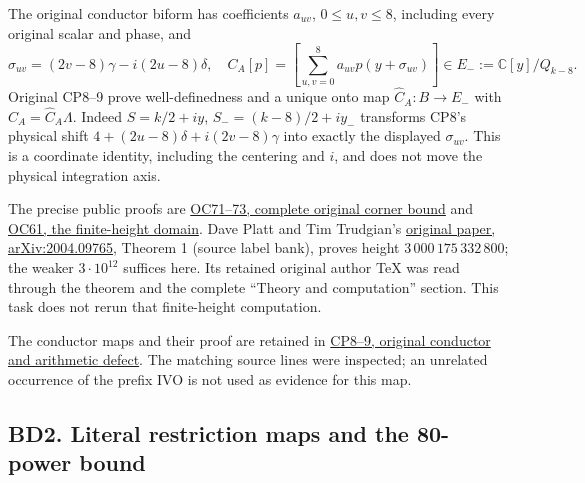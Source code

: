 \documentclass[11pt]{article}
\begin{document}
The original conductor biform has coefficients \(a_{uv}\), \(0\le u,v\le8\), including every original scalar and phase, and \[
\sigma_{uv}=(2v-8)\gamma-i(2u-8)\delta,
\quad C_A[p]=\left[\sum_{u,v=0}^8a_{uv}p(y+\sigma_{uv})\right]
\in E_-:=\mathbb C[y]/Q_{k-8}.
\] Original CP8--9 prove well-definedness and a unique onto map \(\widehat C_A:B\to E_-\) with \(C_A=\widehat C_A\Lambda\). Indeed \(S=k/2+iy\), \(S_-=(k-8)/2+iy_-\) transforms CP8's physical shift \(4+(2u-8)\delta+i(2v-8)\gamma\) into exactly the displayed \(\sigma_{uv}\). This is a coordinate identity, including the centering and \(i\), and does not move the physical integration axis.

The precise public proofs are \href{https://github.com/KokunoYumeto/zeta-function-research-reader/blob/13ca9b136fcdae48df7454bd9bf99e1ef22dd03c/workbenches/splitzero-tandem/continuations/20260922-original-growth-resolvent/RETAINED_COMPLETE_PROOF_SOURCES.tex\#L128308}{OC71--73, complete original corner bound} and \href{https://github.com/KokunoYumeto/zeta-function-research-reader/blob/13ca9b136fcdae48df7454bd9bf99e1ef22dd03c/workbenches/splitzero-tandem/continuations/20260922-original-growth-resolvent/RETAINED_COMPLETE_PROOF_SOURCES.tex\#L279817}{OC61, the finite-height domain}. Dave Platt and Tim Trudgian's \href{https://arxiv.org/abs/2004.09765}{original paper, arXiv:2004.09765}, Theorem 1 (source label bank), proves height \(3\,000\,175\,332\,800\); the weaker \(3\cdot10^{12}\) suffices here. Its retained original author TeX was read through the theorem and the complete ``Theory and computation'' section. This task does not rerun that finite-height computation.

The conductor maps and their proof are retained in \href{https://github.com/KokunoYumeto/zeta-function-research-reader/blob/13ca9b136fcdae48df7454bd9bf99e1ef22dd03c/workbenches/splitzero-tandem/continuations/20260922-original-growth-resolvent/RETAINED_COMPLETE_PROOF_SOURCES.tex\#L281873}{CP8--9, original conductor and arithmetic defect}. The matching source lines were inspected; an unrelated occurrence of the prefix IVO is not used as evidence for this map.

\subsection{BD2. Literal restriction maps and the 80-power bound}\label{bd2.-literal-restriction-maps-and-the-80-power-bound}
\end{document}

